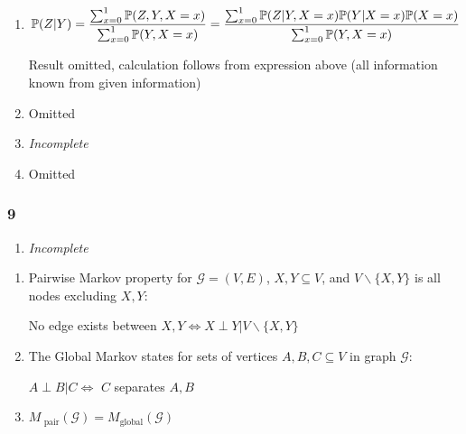 \documentclass[11pt]{article}
\begin{document}
\begin{enumerate}[label=(\alph*)]
    \item 
    \begin{gather*}
        \mathbb{P}(Z|Y)
        =
        \frac{ \sum_{x=0}^1 \mathbb{P}(Z, Y, X=x)}
        { \sum_{x=0}^1 \mathbb{P}(Y, X=x) }
        =
        \frac{ \sum_{x=0}^1 \mathbb{P}(Z|Y, X=x)\mathbb{P}(Y|X=x)\mathbb{P}(X=x)}
        { \sum_{x=0}^1 \mathbb{P}(Y, X=x) }
    \end{gather*}
    
    Result omitted, calculation follows from expression above (all information known from given information)
    
    \item Omitted 
    \item {\it Incomplete}
    \item Omitted   
\end{enumerate}



\subsubsection{9}

\begin{enumerate}[label=(\alph*)]
    \item {\it Incomplete}
\end{enumerate}



\begin{enumerate}
    \item Pairwise Markov property for $\mathcal{G}=(V,E)$,  $X,Y \subseteq V$, and $V\backslash\{X,Y\}$ is all nodes excluding $X,Y$:
    
    {\centering No edge exists between $X,Y \Leftrightarrow X \perp Y | V\backslash\{X,Y\}$ \par}


    \item The Global Markov states for sets of vertices $A, B, C \subseteq V$ in graph $\mathcal{G}$:   

    {\centering 
    $A \perp B | C 
    \Leftrightarrow $
    $C$ separates $A,B$
    \par}

    \item $M_\text{ pair}(\mathcal{G})
    =
    M_\text{global}(\mathcal{G})$
\end{enumerate}
\end{document}
